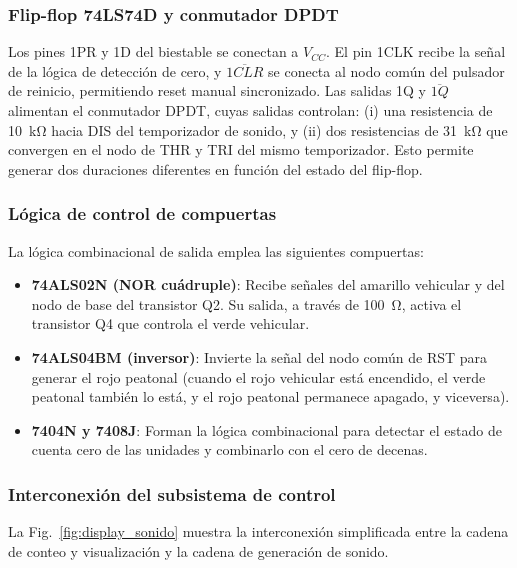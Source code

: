 \documentclass[10pt,onecolumn]{IEEEtran}
\begin{document}
\subsubsection{Flip-flop 74LS74D y conmutador DPDT}

Los pines 1PR y 1D del biestable se conectan a $V_{CC}$. El pin 1CLK recibe la señal de la lógica de detección de cero, y $\overline{1CLR}$ se conecta al nodo común del pulsador de reinicio, permitiendo reset manual sincronizado. Las salidas 1Q y $\overline{1Q}$ alimentan el conmutador DPDT, cuyas salidas controlan: (i) una resistencia de \SI{10}{\kilo\ohm} hacia DIS del temporizador de sonido, y (ii) dos resistencias de \SI{31}{\kilo\ohm} que convergen en el nodo de THR y TRI del mismo temporizador. Esto permite generar dos duraciones diferentes en función del estado del flip-flop.

\subsubsection{Lógica de control de compuertas}

La lógica combinacional de salida emplea las siguientes compuertas:
\begin{itemize}
    \item \textbf{74ALS02N (NOR cuádruple)}: Recibe señales del amarillo vehicular y del nodo de base del transistor Q2. Su salida, a través de \SI{100}{\ohm}, activa el transistor Q4 que controla el verde vehicular.
    \item \textbf{74ALS04BM (inversor)}: Invierte la señal del nodo común de RST para generar el rojo peatonal (cuando el rojo vehicular está encendido, el verde peatonal también lo está, y el rojo peatonal permanece apagado, y viceversa).
    \item \textbf{7404N y 7408J}: Forman la lógica combinacional para detectar el estado de cuenta cero de las unidades y combinarlo con el cero de decenas.
\end{itemize}

\subsubsection{Interconexión del subsistema de control}

La Fig.~\ref{fig:display_sonido} muestra la interconexión simplificada entre la cadena de conteo y visualización y la cadena de generación de sonido.
\end{document}
